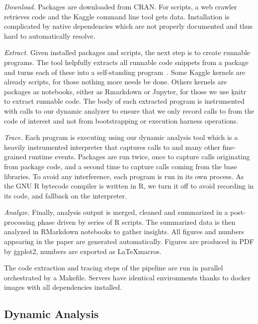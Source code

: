 \documentclass[review,screen,acmsmall,anonymous=true]{acmart}
\begin{document}
\medskip
\begin{compactenum}
\item \emph{Download.} Packages are downloaded from CRAN. For scripts, a web
  crawler retrieves code and the Kaggle command line tool gets data.
  Installation is complicated by native dependencies which are not properly
  documented and thus hard to automatically resolve.
\item \emph{Extract.} Given installed packages and scripts, the next step is to
  create runnable programs. The \genthat tool helpfully extracts all runnable
  code snippets from a package and turns each of these into a self-standing
  program~\cite{issta18}. Some Kaggle kernels are already scripts, for those
  nothing more needs be done. Others kernels are packages as notebooks, either
  as Rmarkdown or Jupyter, for those we use \c{knitr} to extract runnable code.
  The body of each extracted program is instrumented with calls to our dynamic
  analyzer to ensure that we only record calls to \eval from the code of
  interest and not from bootstrapping or execution harness operations.
\item \emph{Trace.} Each program is executing using our dynamic analysis tool
  which is a heavily instrumented interpreter that captures calls to \eval and
  many other fine-grained runtime events. Packages are run twice, once to
  capture \eval calls originating from package code, and a second time to
  capture calls coming from the base libraries. To avoid any interference, each
  program is run in its own process.
  As the GNU R bytecode compiler is written in R, we turn it off
  to avoid recording \eval in its code, and fallback on the interpreter.
\item \emph{Analyze.} Finally, analysis output is merged, cleaned and summarized
  in a post-processing phase driven by series of R scripts. The summarized data
  is then analyzed in RMarkdown notebooks to gather insights. All figures and
  numbers appearing in the paper are generated automatically. Figures are
  produced in PDF by \c{ggplot2}, numbers are exported as \LaTeX macros.
\end{compactenum}

\medskip\noindent The code extraction and tracing steps of the pipeline are run
in parallel~\cite{GNUparallel} orchestrated by a Makefile. Servers have
identical environments thanks to docker images with all dependencies installed.

\subsection{Dynamic Analysis}
\end{document}
